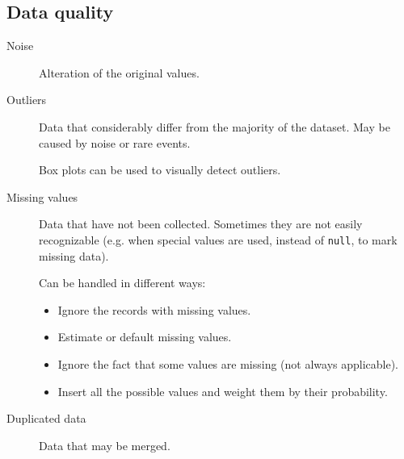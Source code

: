 \subsection{Data quality}
\begin{description}
    \item[Noise] 
        Alteration of the original values.

    \item[Outliers] 
        Data that considerably differ from the majority of the dataset.
        May be caused by noise or rare events.

        Box plots can be used to visually detect outliers.

    \item[Missing values] 
        Data that have not been collected.
        Sometimes they are not easily recognizable 
        (e.g. when special values are used, instead of \texttt{null}, to mark missing data).

        Can be handled in different ways:
        \begin{itemize}
            \item Ignore the records with missing values.
            \item Estimate or default missing values.
            \item Ignore the fact that some values are missing (not always applicable).
            \item Insert all the possible values and weight them by their probability.
        \end{itemize}

    \item[Duplicated data] 
        Data that may be merged.
\end{description}